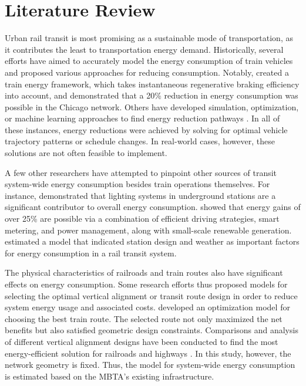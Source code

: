 \documentclass[times]{TRR}
\begin{document}
\section{Literature Review} 
Urban rail transit is most promising as a sustainable mode of transportation, as it contributes the least to transportation energy demand. 
Historically, several efforts have aimed to accurately model the energy consumption of train vehicles and proposed various approaches for reducing consumption.
Notably, \citeauthor{wang2017electric} \cite{wang2017electric} created a train energy framework, which takes instantaneous regenerative braking efficiency into account, and demonstrated that a 20\% reduction in energy consumption was possible in the Chicago network. Others have developed simulation, optimization, or machine learning approaches to find energy reduction pathways \cite{higuera2016energy, mao2018modeling,ruigang2017simulation, modi2020estimation, malikopoulos2012optimization, oettich2004improvements, li2018calculation}. In all of these instances, energy reductions were achieved by solving for optimal vehicle trajectory patterns or schedule changes. In real-world cases, however, these solutions are not often feasible to implement.

A few other researchers have attempted to pinpoint other sources of transit system-wide energy consumption besides train operations themselves. For instance, \cite{wang2020rail} demonstrated that lighting systems in underground stations are a significant contributor to overall energy consumption. \citeauthor{gonzalez-gil2014systems} \cite{gonzalez-gil2014systems} showed that energy gains of over 25\% are possible via a combination of efficient driving strategies, smart metering, and power management, along with small-scale renewable generation. \citeauthor{leung2013estimation} \cite{leung2013estimation} estimated a model that indicated station design and weather as important factors for energy consumption in a rail transit system.

The physical characteristics of railroads and train routes also have significant effects on energy consumption. Some research efforts thus proposed models for selecting the optimal vertical alignment or transit route design in order to reduce  system energy usage and associated costs. \citeauthor{kang2014rail}  \cite{kang2014rail} developed an optimization model  for choosing the best train route. The selected route not only maximized the net benefits but also satisfied geometric design constraints.  Comparisons and analysis of different vertical alignment designs have been conducted to find the most energy-efficient solution for railroads \cite{kim2019vertical,kim2013comparison} and highways \cite{kang2013new}. In this study, however, the network geometry is fixed. Thus, the model for system-wide energy consumption is estimated based on the MBTA's existing infrastructure.
\end{document}

